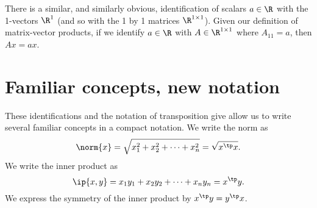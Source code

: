 There is a similar, and similarly obvious, identification of scalars $a \in \R$ with the 1-vectors $\R ^{1}$ (and so with the 1 by 1 matrices $\R ^{1 \times 1}$).
Given our definition of matrix-vector products, if we identify $a \in \R $ with $A \in \R^{1 \times 1}$ where $A_{11} = a$, then $Ax = ax$.

\section*{Familiar concepts, new notation}

These identifications and the notation of transposition give allow us to write several familiar concepts in a compact notation.
We write the norm as
  \[
\norm{x} = \sqrt{x_1^2 + x_2^2 + \cdots + x_n^2} = \sqrt{x^\tp x}.
  \]
We write the inner product as
  \[
\ip{x,y} =
x_1y_1 + x_2y_2 + \cdots + x_ny_n
= x^\tp y.
  \]
We express the symmetry of the inner product by $ x^\tp y = y^\tp x$.
